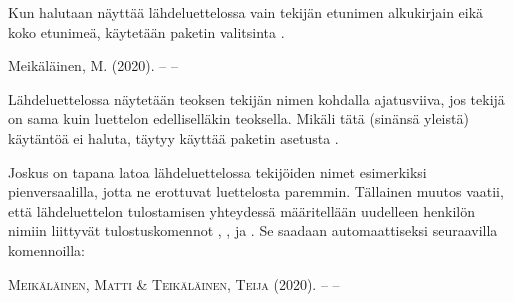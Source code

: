 \begin{koodilohkosis}
\usepackage[style=authoryear, maxbibnames=99, minbibnames=3,
  maxcitenames=3, mincitenames=1, uniquelist=true]{biblatex}
\end{koodilohkosis}

Kun halutaan näyttää lähdeluettelossa vain tekijän etunimen alkukirjain
eikä koko etunimeä, käytetään paketin valitsinta .

\begin{koodilohkosis}
\usepackage[…, giveninits]{biblatex}
\end{koodilohkosis}

\begin{tulossis}
  Meikäläinen, M. (2020). -- --
\end{tulossis}

Lähdeluettelossa näytetään teoksen tekijän nimen kohdalla ajatusviiva,
jos tekijä on sama kuin luettelon edelliselläkin teoksella. Mikäli tätä
(sinänsä yleistä) käytäntöä ei haluta, täytyy käyttää paketin asetusta
.

\begin{koodilohkosis}
\usepackage[…, dashed=false]{biblatex}
\end{koodilohkosis}

Joskus on tapana latoa lähdeluettelossa tekijöiden nimet esimerkiksi
pienversaalilla, jotta ne erottuvat luettelosta paremmin. Tällainen
muutos vaatii, että lähdeluettelon tulostamisen yhteydessä määritellään
uudelleen henkilön nimiin liittyvät tulostuskomennot
, ,
 ja . Se saadaan
automaattiseksi seuraavilla komennoilla:

\begin{koodilohkosis}
\end{koodilohkosis}

\begin{tulossis}
  \textsc{Meikäläinen}, \textsc{Matti} \& \textsc{Teikäläinen},
  \textsc{Teija} (2020). -- --
\end{tulossis}

